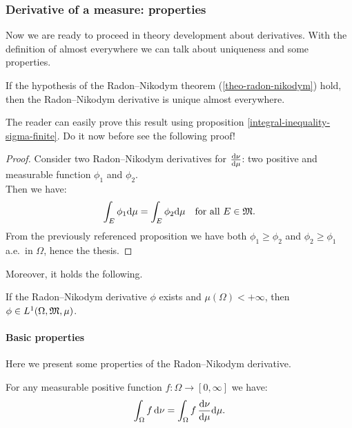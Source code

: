\subsubsection{Derivative of a measure: properties}
Now we are ready to proceed in theory development about derivatives. With the definition of almost everywhere we can talk about uniqueness and some properties.

\begin{prop}
	If the hypothesis of the Radon--Nikodym theorem (\vref{theo-radon-nikodym}) hold, then the Radon--Nikodym derivative is unique almost everywhere.
\end{prop}
The reader can easily prove this result using proposition \vref{integral-inequality-sigma-finite}. Do it now before see the following proof!

\begin{proof}
	Consider two Radon--Nikodym derivatives for $\frac{\mathrm d \nu}{\mathrm d \mu}$: two positive and measurable function $\phi_1$ and $\phi_2$.\\
	Then we have: $$\int_E \phi_1 \mathrm d \mu = \int_E \phi_2 \mathrm d \mu \quad \text{for all } E \in \mathfrak M.$$
	From the previously referenced proposition we have both $\phi_1 \geq \phi_2$ and $\phi_2 \geq \phi_1$ a.e.\ in $\Omega$, hence the thesis.
\end{proof}

Moreover, it holds the following.
\begin{prop}
	If the Radon--Nikodym derivative $\phi$ exists and $\mu (\Omega) < +\infty$, then $\phi \in L^1(\Omega, \mathfrak M, \mu)$. 
\end{prop}
%

\paragraph{Basic properties} Here we present some properties of the Radon--Nikodym derivative.

\begin{prop}
	For any measurable positive function $f:\Omega \to [0,\infty]$ we have:
	$$ \int_\Omega f \, \mathrm d \nu = \int_\Omega f \, \frac{\mathrm d \nu}{\mathrm d \mu} \mathrm d \mu.$$
\end{prop}

